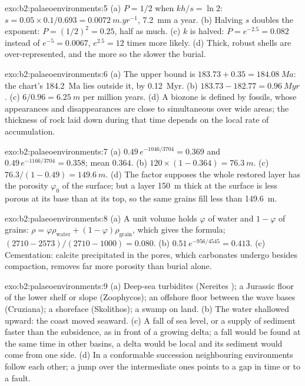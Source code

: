 \begin{solution}{exo:b2:palaeoenvironments:5}
(a) $P = 1/2$ when $kh/s = \ln 2$: $s = 0.05 \times 0.1/0.693 = \qty{0.0072}{m.yr^{-1}}$,
\qty{7.2}{mm} a year. (b) Halving $s$ doubles the exponent: $P = (1/2)^2 = 0.25$, half as much.
(c) $k$ is halved: $P = e^{-2.5} = 0.082$ instead of $e^{-5} = 0.0067$, $e^{2.5} = 12$ times more
likely. (d) Thick, robust shells are over-represented, and the more so the slower the burial.
\end{solution}

\begin{solution}{exo:b2:palaeoenvironments:6}
(a) The upper bound is $183.73 + 0.35 = \qty{184.08}{Ma}$: the chart's \qty{184.2}{Ma} lies
outside it, by \qty{0.12}{Myr}. (b) $183.73 - 182.77 = \qty{0.96}{Myr}$. (c) $6/0.96 =
\qty{6.25}{m}$ per million years. (d) A biozone is defined by fossils, whose appearances and
disappearances are close to simultaneous over wide areas; the thickness of rock laid down during
that time depends on the local rate of accumulation.
\end{solution}

\begin{solution}{exo:b2:palaeoenvironments:7}
(a) $0.49\,e^{-1046/3704} = 0.369$ and $0.49\,e^{-1166/3704} = 0.358$; mean $0.364$. (b) $120
\times (1 - 0.364) = \qty{76.3}{m}$. (c) $76.3/(1 - 0.49) = \qty{149.6}{m}$. (d) The factor
supposes the whole restored layer has the porosity $\varphi_0$ of the surface; but a layer
\qty{150}{m} thick at the surface is less porous at its base than at its top, so the same grains
fill less than \qty{149.6}{m}.
\end{solution}

\begin{solution}{exo:b2:palaeoenvironments:8}
(a) A unit volume holds $\varphi$ of water and $1 - \varphi$ of grains: $\rho = \varphi
\rho_{\text{water}} + (1 - \varphi)\rho_{\text{grain}}$, which gives the formula; $(2710 -
2573)/(2710 - 1000) = 0.080$. (b) $0.51\,e^{-956/4545} = 0.413$. (c) Cementation: calcite
precipitated in the pores, which carbonates undergo besides compaction, removes far more porosity
than burial alone.
\end{solution}

\begin{solution}{exo:b2:palaeoenvironments:9}
(a) Deep-sea turbidites (Nereites ); a Jurassic floor of the lower shelf or slope
(Zoophycos); an offshore floor between the wave bases (Cruziana); a shoreface (Skolithos); a
swamp on land. (b) The water shallowed upward: the coast moved seaward. (c) A fall of sea level,
or a supply of sediment faster than the subsidence, as in front of a growing delta; a fall would
be found at the same time in other basins, a delta would be local and its sediment would come
from one side. (d) In a conformable succession neighbouring environments follow each other; a
jump over the intermediate ones points to a gap in time or to a fault.
\end{solution}

